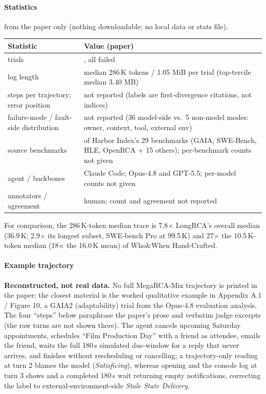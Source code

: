 \paragraph{Statistics} from the paper only (nothing downloadable; no local data or stats file).\par\nobreak\vspace{1pt}
\noindent\begin{minipage}[t]{\linewidth}\vspace{0pt}\small
\begin{tabularx}{\linewidth}{@{}l>{\RaggedRight}X@{}}\toprule
Statistic & Value (paper)\\\midrule
trials & 50, all failed\\
log length & median 286\,K tokens / 1.05 MiB per trial (top-tercile median 3.40 MB)\\
steps per trajectory; error position & not reported (labels are first-divergence citations, not indices)\\
failure-mode / fault-side distribution & not reported (36 model-side vs.\ 5 non-model modes: owner, context, tool, external env)\\
source benchmarks & 19 of Harbor Index's 29 benchmarks (GAIA, SWE-Bench, HLE, OpenRCA + 15 others); per-benchmark counts not given\\
agent / backbones & Claude Code; Opus-4.8 and GPT-5.5; per-model counts not given\\
annotators / agreement & human; count and agreement not reported\\\bottomrule
\end{tabularx}

\smallskip For comparison, the 286\,K-token median trace is 7.8$\times$ LongRCA's overall median (36.9\,K; 2.9$\times$ its longest subset, SWE-bench Pro at 99.5\,K) and 27$\times$ the 10.5\,K-token median (18$\times$ the 16.0\,K mean) of Who\&When Hand-Crafted.
\end{minipage}

\paragraph{Example trajectory} \textbf{Reconstructed, not real data.} No full MegaRCA-Mix trajectory is printed in the paper; the closest material is the worked qualitative example in Appendix A.1 / Figure 10, a GAIA2 (adaptability) trial  from the Opus-4.8 evaluation analysis. The four ``steps'' below paraphrase the paper's prose and verbatim judge excerpts (the raw turns are not shown there). The agent cancels upcoming Saturday appointments, schedules ``Film Production Day'' with a friend as attendee, emails the friend, waits the full 180\,s simulated due-window for a reply that never arrives, and finishes without rescheduling or cancelling; a trajectory-only reading at turn 2 blames the model (\emph{Satisficing}), whereas opening  and the console log at turn 3 shows  and a completed 180\,s wait returning empty notifications, correcting the label to external-environment-side \emph{Stale State Delivery}.


